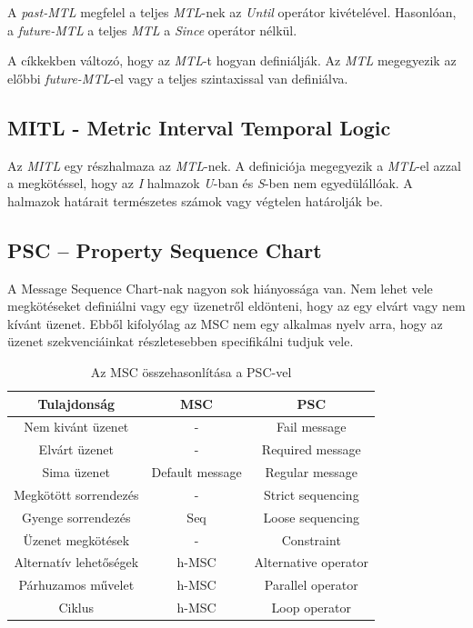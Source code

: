 A \textit{past-MTL} megfelel a teljes \textit{MTL}-nek az \textit{Until} operátor kivételével.
Hasonlóan, a \textit{future-MTL} a teljes \textit{MTL} a \textit{Since} operátor nélkül.

A cíkkekben változó, hogy az \textit{MTL}-t hogyan definiálják.
Az \textit{MTL} megegyezik az előbbi \textit{future-MTL}-el vagy a teljes szintaxissal van definiálva.

\subsection{MITL - Metric Interval Temporal Logic}

Az \textit{MITL} egy részhalmaza az \textit{MTL}-nek.
A definiciója megegyezik a \textit{MTL}-el azzal a megkötéssel, hogy az \textit{I} halmazok \textit{U}-ban és \textit{S}-ben nem egyedülállóak.
A halmazok határait természetes számok vagy végtelen határolják be.

\subsection{PSC – Property Sequence Chart}
A Message Sequence Chart-nak nagyon sok hiányossága van.
Nem lehet vele megkötéseket definiálni vagy egy üzenetről eldönteni, hogy az egy elvárt vagy nem kívánt üzenet.
Ebből kifolyólag az MSC nem egy alkalmas nyelv arra, hogy az üzenet szekvenciáinkat részletesebben specifikálni tudjuk vele.

\begin{table}[ht]
    \centering %
    \begin{tabular}{ |c|c|c| } %
    \hline
    \textbf{Tulajdonság} & \textbf{MSC} & \textbf{PSC} \\ [0.5ex] %
    \hline %
    \hline
    Nem kivánt üzenet & - & Fail message \\ %
    \hline
    Elvárt üzenet & - & Required message \\
    \hline
    Sima üzenet & Default message & Regular message \\
    \hline
    Megkötött sorrendezés & - & Strict sequencing \\
    \hline
    Gyenge sorrendezés & Seq & Loose sequencing \\
    \hline
    Üzenet megkötések & - & Constraint \\
    \hline
    Alternatív lehetőségek & h-MSC & Alternative operator \\
    \hline
    Párhuzamos művelet & h-MSC & Parallel operator \\
    \hline
    Ciklus & h-MSC & Loop operator \\
    \hline %
    \end{tabular}
    \label{table:nonlin} %
    \caption{Az MSC összehasonlítása a PSC-vel} %
\end{table}

